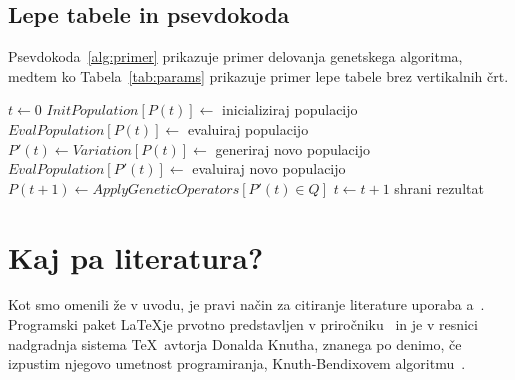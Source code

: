 \documentclass[a4paper, 12pt]{book}
\begin{document}
\section{Lepe tabele in psevdokoda}
\label{sec:psevdokoda}

Psevdokoda~\ref{alg:primer} prikazuje primer delovanja genetskega algoritma, medtem ko Tabela~\ref{tab:params} prikazuje primer lepe tabele brez vertikalnih črt.

\begin{algorithm}
\caption{Psevdokoda genetskega algoritma}
\label{alg:primer}
\begin{algorithmic}[1]
\footnotesize
\STATE $t \gets 0$
\STATE $InitPopulation[P(t)] \gets$ inicializiraj populacijo
\STATE $EvalPopulation[P(t)] \gets$ evaluiraj populacijo
\REPEAT
\STATE $P'(t) \gets Variation[P(t)] \gets $ generiraj novo populacijo
\STATE $EvalPopulation[P'(t)] \gets$ evaluiraj novo populacijo
\STATE $P(t+1) \gets ApplyGeneticOperators[P'(t) \in Q]$
\STATE $t \gets t+1$
\STATE shrani rezultat
\ENDIF
\end{algorithmic}
\end{algorithm}

\begin{table}
\caption{Primer enostavne tabele.}
\centering
{}
\label{tab:params}
\end{table}

\chapter{Kaj pa literatura?}
\label{ch3}
Kot smo omenili že v uvodu, je pravi način za citiranje literature uporaba \BibTeX{}a~\cite{ubi}.
Programski paket \LaTeX je prvotno predstavljen v priročniku~\cite{Lamport} in je v resnici nadgradnja sistema \TeX\ avtorja Donalda Knutha, znanega po denimo, če izpustim njegovo umetnost programiranja, Knuth-Bendixovem algoritmu~\cite{Knuth}.
\end{document}
